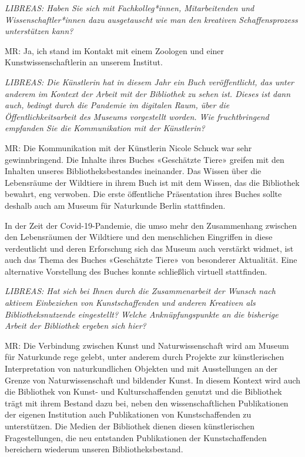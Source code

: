 \documentclass[a4paper,
fontsize=11pt,
oneside,
numbers=noperiodatend,
parskip=half-,
bibliography=totoc,
final
]{scrartcl}
\begin{document}
\emph{LIBREAS: Haben Sie sich mit Fachkolleg*innen, Mitarbeitenden und
Wissenschaftler*innen dazu ausgetauscht wie man den kreativen
Schaffensprozess unterstützen kann?}

MR: Ja, ich stand im Kontakt mit einem Zoologen und einer
Kunstwissenschaftlerin an unserem Institut.

\emph{LIBREAS: Die Künstlerin hat in diesem Jahr ein Buch
veröffentlicht, das unter anderem im Kontext der Arbeit mit der
Bibliothek zu sehen ist. Dieses ist dann auch, bedingt durch die
Pandemie im digitalen Raum, über die Öffentlichkeitsarbeit des Museums
vorgestellt worden. Wie fruchtbringend empfanden Sie die Kommunikation
mit der Künstlerin?}

MR: Die Kommunikation mit der Künstlerin Nicole Schuck war sehr
gewinnbringend. Die Inhalte ihres Buches «Geschätzte Tiere» greifen mit
den Inhalten unseres Bibliotheksbestandes ineinander. Das Wissen über
die Lebensräume der Wildtiere in ihrem Buch ist mit dem Wissen, das die
Bibliothek bewahrt, eng verwoben. Die erste öffentliche Präsentation
ihres Buches sollte deshalb auch am Museum für Naturkunde Berlin
stattfinden.

In der Zeit der Covid-19-Pandemie, die umso mehr den Zusammenhang
zwischen den Lebensräumen der Wildtiere und den menschlichen Eingriffen
in diese verdeutlicht und deren Erforschung sich das Museum auch
verstärkt widmet, ist auch das Thema des Buches «Geschätzte Tiere» von
besonderer Aktualität. Eine alternative Vorstellung des Buches konnte
schließlich virtuell stattfinden.

\emph{LIBREAS: Hat sich bei Ihnen durch die Zusammenarbeit der Wunsch
nach aktivem Einbeziehen von Kunstschaffenden und anderen Kreativen als
Bibliotheksnutzende eingestellt? Welche Anknüpfungspunkte an die
bisherige Arbeit der Bibliothek ergeben sich hier?}

MR: Die Verbindung zwischen Kunst und Naturwissenschaft wird am Museum
für Naturkunde rege gelebt, unter anderem durch Projekte zur
künstlerischen Interpretation von naturkundlichen Objekten und mit
Ausstellungen an der Grenze von Naturwissenschaft und bildender Kunst.
In diesem Kontext wird auch die Bibliothek von Kunst- und
Kulturschaffenden genutzt und die Bibliothek trägt mit ihrem Bestand
dazu bei, neben den wissenschaftlichen Publikationen der eigenen
Institution auch Publikationen von Kunstschaffenden zu unterstützen. Die
Medien der Bibliothek dienen diesen künstlerischen Fragestellungen, die
neu entstanden Publikationen der Kunstschaffenden bereichern wiederum
unseren Bibliotheksbestand.
\end{document}

